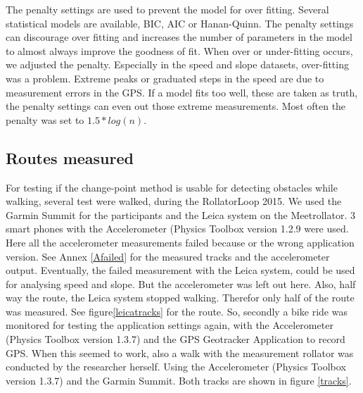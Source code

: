 The penalty settings are used to prevent the model for over fitting. Several statistical models are available, BIC, AIC or Hanan-Quinn. The penalty settings can discourage over fitting and increases the number of parameters in the model to almost always improve the goodness of fit. When over or under-fitting occurs, we adjusted the penalty. Especially in the speed and slope datasets, over-fitting was a problem. Extreme peaks or graduated steps in the speed are due to measurement errors in the GPS. If a model fits too well, these are taken as truth, the penalty settings can even out those extreme measurements. Most often the penalty was set to $1.5 * log(n)$. 

\subsection{Routes measured}
For testing if the change-point method is usable for detecting obstacles while walking, several test were walked, during the RollatorLoop 2015.
We used the Garmin Summit for the participants and the Leica system on the Meetrollator. 3 smart phones with the Accelerometer (Physics Toolbox version 1.2.9 were used. Here all the accelerometer measurements failed because or the wrong application version.  See Annex \ref{Afailed} for the measured tracks and the accelerometer output. Eventually, the failed measurement with the Leica system, could be used for analysing speed and slope. But the accelerometer was left out here. Also, half way the route, the Leica system stopped walking. Therefor only half of the route was measured. See figure\ref{leicatracks} for the route.
So, secondly a bike ride was monitored for testing the application settings again, with the Accelerometer (Physics Toolbox version 1.3.7) and the GPS Geotracker Application to record GPS. When this seemed to work, also a walk with the measurement rollator was conducted by the researcher herself. Using the Accelerometer (Physics Toolbox version 1.3.7) and the Garmin Summit. Both tracks are shown in figure \ref{tracks}.

